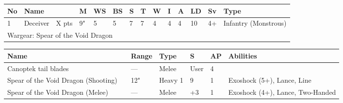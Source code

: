 \noindent
\begin{tabular}{||m{10pt} m{95pt} m{30pt} m{11pt} m{11pt} m{11pt} m{11pt} m{11pt} m{11pt} m{11pt} m{11pt} m{11pt} m{11pt} m{125pt}||}
\hline
No & Name & & M & WS & BS & S & T & W & I & A & LD & Sv & Type \\
\hline
1 & Deceiver & X pts & 9" & 5 & 5 & 7 & 7 & 4 & 4 & 4 & 10 & 4+ & Infantry (Monstrous)\\
\hline
\hline
\multicolumn{14}{||Z{532 pt}||}{Wargear: Spear of the Void Dragon}\\
\hline
\end{tabular}

\noindent
\begin{tabular}{||m{140pt} m{0pt} m{31pt} m{55pt} m{12pt} m{12pt} m{210pt}||}
\hline
Name & & Range & Type & S & AP & Abilities \\
\hline
Canoptek tail blades & & — & Melee & User & 4 & \\
Spear of the Void Dragon (Shooting) &  & 12" & Heavy 1 & 9 & 1 & Exoshock (5+), Lance, Line \\
Spear of the Void Dragon (Melee) &  & — & Melee & +3 & 1 & Exoshock (4+), Lance, Two-Handed \\
\hline
\end{tabular}

